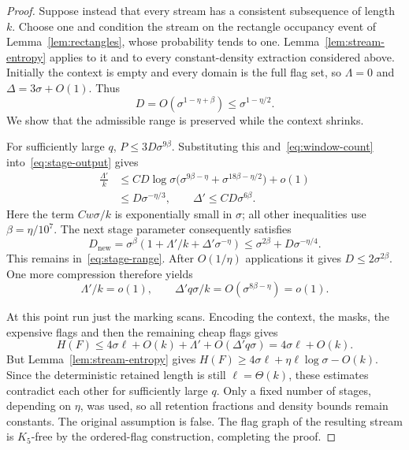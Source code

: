 \begin{proof}
Suppose instead that every stream has a consistent subsequence of
length $k$.  Choose one and condition the stream on the rectangle
occupancy event of Lemma~\ref{lem:rectangles}, whose probability tends
to one.  Lemma~\ref{lem:stream-entropy} applies to it and to every
constant-density extraction considered above.
Initially the context is empty and every domain is the full flag set,
so $\Lambda=0$ and $\Delta=3\sigma+O(1)$.  Thus
\[
 D=O(\sigma^{1-\eta+\beta})\le\sigma^{1-\eta/2}.
\]
We show that the admissible range is preserved while the context shrinks.

For sufficiently large $q$, $P\le3D\sigma^{9\beta}$.
Substituting this and~\eqref{eq:window-count}
into~\eqref{eq:stage-output} gives
\begin{align*}
 \frac{\Lambda'}{k}
 &\le CD\log\sigma
       \bigl(\sigma^{9\beta-\eta}
                +\sigma^{18\beta-\eta/2}\bigr)+o(1)\\
 &\le D\sigma^{-\eta/3},
 \qquad \Delta'\le CD\sigma^{6\beta}.
\end{align*}
Here the term $Cw\sigma/k$ is exponentially small in $\sigma$;
all other inequalities use $\beta=\eta/10^7$.
The next stage parameter consequently satisfies
\begin{equation}\label{eq:D-recurrence}
 D_{\mathrm{new}}
 =\sigma^\beta(1+\Lambda'/k+\Delta'\sigma^{-\eta})
 \le\sigma^{2\beta}+D\sigma^{-\eta/4}.
\end{equation}
This remains in~\eqref{eq:stage-range}.
After $O(1/\eta)$ applications it gives $D\le2\sigma^{2\beta}$.
One more compression therefore yields
\[
 \Lambda'/k=o(1),\qquad
 \Delta' q\sigma/k=O(\sigma^{8\beta-\eta})=o(1).
\]

At this point run just the marking scans.  Encoding the context,
the masks, the expensive flags and then the remaining cheap flags gives
\[
 H(F)\le4\sigma\ell+O(k)+\Lambda'+O(\Delta' q\sigma)
       =4\sigma\ell+O(k).
\]
But Lemma~\ref{lem:stream-entropy} gives
$H(F)\ge4\sigma\ell+\eta\ell\log\sigma-O(k)$.
Since the deterministic retained length is still $\ell=\Theta(k)$,
these estimates contradict each other for sufficiently large $q$.
Only a fixed number of stages, depending on $\eta$, was used, so all
retention fractions and density bounds remain constants.  The original
assumption is false.  The flag graph of the resulting stream is
$K_5$-free by the ordered-flag construction, completing the proof.
\end{proof}

